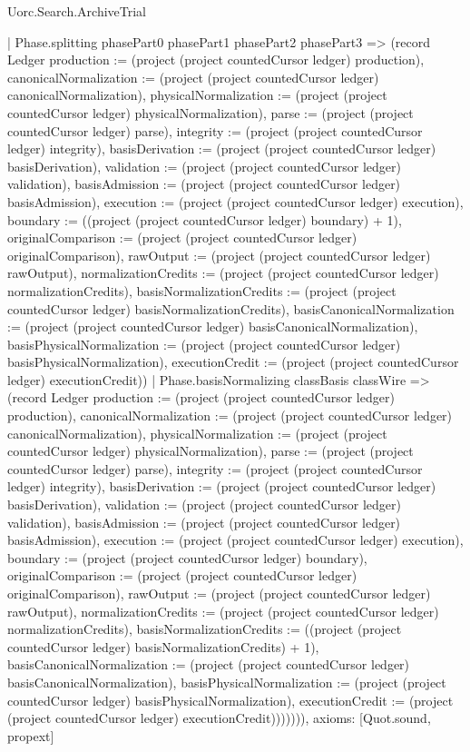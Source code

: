 \begin{lexlean}{Uorc.Search.ArchiveTrial}
\begin{semanticmodule}
{{    | Phase.splitting phasePart0 phasePart1 phasePart2 phasePart3 => (record Ledger {production := (project (project countedCursor ledger) production), canonicalNormalization := (project (project countedCursor ledger) canonicalNormalization), physicalNormalization := (project (project countedCursor ledger) physicalNormalization), parse := (project (project countedCursor ledger) parse), integrity := (project (project countedCursor ledger) integrity), basisDerivation := (project (project countedCursor ledger) basisDerivation), validation := (project (project countedCursor ledger) validation), basisAdmission := (project (project countedCursor ledger) basisAdmission), execution := (project (project countedCursor ledger) execution), boundary := ((project (project countedCursor ledger) boundary) + 1), originalComparison := (project (project countedCursor ledger) originalComparison), rawOutput := (project (project countedCursor ledger) rawOutput), normalizationCredits := (project (project countedCursor ledger) normalizationCredits), basisNormalizationCredits := (project (project countedCursor ledger) basisNormalizationCredits), basisCanonicalNormalization := (project (project countedCursor ledger) basisCanonicalNormalization), basisPhysicalNormalization := (project (project countedCursor ledger) basisPhysicalNormalization), executionCredit := (project (project countedCursor ledger) executionCredit)})
    | Phase.basisNormalizing classBasis classWire => (record Ledger {production := (project (project countedCursor ledger) production), canonicalNormalization := (project (project countedCursor ledger) canonicalNormalization), physicalNormalization := (project (project countedCursor ledger) physicalNormalization), parse := (project (project countedCursor ledger) parse), integrity := (project (project countedCursor ledger) integrity), basisDerivation := (project (project countedCursor ledger) basisDerivation), validation := (project (project countedCursor ledger) validation), basisAdmission := (project (project countedCursor ledger) basisAdmission), execution := (project (project countedCursor ledger) execution), boundary := (project (project countedCursor ledger) boundary), originalComparison := (project (project countedCursor ledger) originalComparison), rawOutput := (project (project countedCursor ledger) rawOutput), normalizationCredits := (project (project countedCursor ledger) normalizationCredits), basisNormalizationCredits := ((project (project countedCursor ledger) basisNormalizationCredits) + 1), basisCanonicalNormalization := (project (project countedCursor ledger) basisCanonicalNormalization), basisPhysicalNormalization := (project (project countedCursor ledger) basisPhysicalNormalization), executionCredit := (project (project countedCursor ledger) executionCredit)}))})))),
  axioms: [Quot.sound, propext]
}


\end{semanticmodule}
\end{lexlean}
